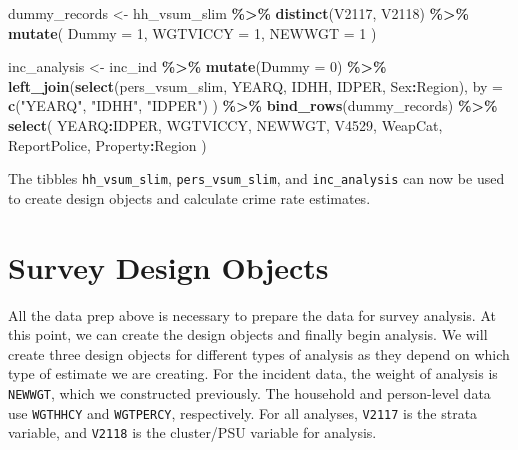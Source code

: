 \documentclass[
]{krantz}
\makeatletter
\newenvironment{Shaded}{\begin{snugshade}}{\end{snugshade}}
\newcommand{\AttributeTok}[1]{\textcolor[rgb]{0.27,0.27,0.27}{#1}}
\newcommand{\DecValTok}[1]{\textcolor[rgb]{0.06,0.06,0.06}{#1}}
\newcommand{\FunctionTok}[1]{\textcolor[rgb]{0.27,0.27,0.27}{\textbf{#1}}}
\newcommand{\NormalTok}[1]{#1}
\newcommand{\OtherTok}[1]{\textcolor[rgb]{0.37,0.37,0.37}{#1}}
\newcommand{\SpecialCharTok}[1]{\textcolor[rgb]{0.43,0.43,0.43}{\textbf{#1}}}
\newcommand{\StringTok}[1]{\textcolor[rgb]{0.5,0.5,0.5}{#1}}
\newenvironment{kframe}{%
\medskip{}
\setlength{\fboxsep}{.8em}
 \def\at@end@of@kframe{}%
 \ifinner\ifhmode%
  \def\at@end@of@kframe{\end{minipage}}%
  \begin{minipage}{\columnwidth}%
 \fi\fi%
 \def\FrameCommand##1{\hskip\@totalleftmargin \hskip-\fboxsep
 \colorbox{shadecolor}{##1}\hskip-\fboxsep
     \hskip-\linewidth \hskip-\@totalleftmargin \hskip\columnwidth}%
 \MakeFramed {\advance\hsize-\width
   \@totalleftmargin\z@ \linewidth\hsize
   \@setminipage}}%
 {\par\unskip\endMakeFramed%
 \at@end@of@kframe}
\renewenvironment{Shaded}{\begin{kframe}}{\end{kframe}}
\makeatother
\begin{document}
\begin{Shaded}
\begin{Highlighting}[]
\NormalTok{dummy\_records }\OtherTok{\textless{}{-}}\NormalTok{ hh\_vsum\_slim }\SpecialCharTok{\%\textgreater{}\%}
  \FunctionTok{distinct}\NormalTok{(V2117, V2118) }\SpecialCharTok{\%\textgreater{}\%}
  \FunctionTok{mutate}\NormalTok{(}
    \AttributeTok{Dummy =} \DecValTok{1}\NormalTok{,}
    \AttributeTok{WGTVICCY =} \DecValTok{1}\NormalTok{,}
    \AttributeTok{NEWWGT =} \DecValTok{1}
\NormalTok{  )}

\NormalTok{inc\_analysis }\OtherTok{\textless{}{-}}\NormalTok{ inc\_ind }\SpecialCharTok{\%\textgreater{}\%}
  \FunctionTok{mutate}\NormalTok{(}\AttributeTok{Dummy =} \DecValTok{0}\NormalTok{) }\SpecialCharTok{\%\textgreater{}\%}
  \FunctionTok{left\_join}\NormalTok{(}\FunctionTok{select}\NormalTok{(pers\_vsum\_slim, YEARQ, IDHH, IDPER, Sex}\SpecialCharTok{:}\NormalTok{Region),}
    \AttributeTok{by =} \FunctionTok{c}\NormalTok{(}\StringTok{"YEARQ"}\NormalTok{, }\StringTok{"IDHH"}\NormalTok{, }\StringTok{"IDPER"}\NormalTok{)}
\NormalTok{  ) }\SpecialCharTok{\%\textgreater{}\%}
  \FunctionTok{bind\_rows}\NormalTok{(dummy\_records) }\SpecialCharTok{\%\textgreater{}\%}
  \FunctionTok{select}\NormalTok{(}
\NormalTok{    YEARQ}\SpecialCharTok{:}\NormalTok{IDPER,}
\NormalTok{    WGTVICCY,}
\NormalTok{    NEWWGT,}
\NormalTok{    V4529,}
\NormalTok{    WeapCat,}
\NormalTok{    ReportPolice,}
\NormalTok{    Property}\SpecialCharTok{:}\NormalTok{Region}
\NormalTok{  )}
\end{Highlighting}
\end{Shaded}

The tibbles \texttt{hh\_vsum\_slim}, \texttt{pers\_vsum\_slim}, and \texttt{inc\_analysis} can now be used to create design objects and calculate crime rate estimates.

\hypertarget{survey-design-objects}{%
\section{Survey Design Objects}\label{survey-design-objects}}

All the data prep above is necessary to prepare the data for survey analysis. At this point, we can create the design objects and finally begin analysis. We will create three design objects for different types of analysis as they depend on which type of estimate we are creating. For the incident data, the weight of analysis is \texttt{NEWWGT}, which we constructed previously. The household and person-level data use \texttt{WGTHHCY} and \texttt{WGTPERCY}, respectively. For all analyses, \texttt{V2117} is the strata variable, and \texttt{V2118} is the cluster/PSU variable for analysis.
\end{document}
